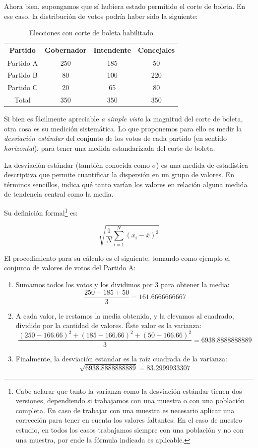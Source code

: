 \documentclass[12pt,a4paper]{article}
\begin{document}
Ahora bien, supongamos que sí hubiera estado permitido el corte de boleta. En
ese caso, la distribución de votos podría haber sido la siguiente:

\renewcommand{\arraystretch}{1.25}
\begin{table}[h!]
\centering
\begin{tabular}{c c c c} 
 Partido & Gobernador & Intendente & Concejales \\ [0.5ex] 
 \hline
Partido A & 250 & 185 & 50 \\
Partido B & 80 & 100 & 220 \\
Partido C & 20 & 65 & 80 \\
 \hline
Total & 350 & 350 & 350 \\ [1ex]
 \hline
\end{tabular}
\caption{Elecciones con corte de boleta habilitado}
\label{table:1}
\end{table}

Si bien es fácilmente apreciable \emph{a simple vista} la magnitud del corte de boleta, otra cosa es
su medición sistemática. Lo que proponemos para ello es medir la
\emph{desviación estándar} del conjunto de los votos de cada partido (en sentido
\emph{horizontal}), para tener una medida estandarizada del corte de boleta.

La desviación estándar (también conocida como \(\sigma\)) es una medida de
estadística descriptiva que permite 
cuantificar la dispersión en un grupo de valores. En términos sencillos, indica
qué tanto varían los valores en relación alguna medida de tendencia central como
la media.

Su definición formal\footnote{Cabe aclarar que tanto la varianza como la
  desviación estándar tienen dos versiones, dependiendo si trabajamos con una
  muestra o con una población completa. En caso de trabajar con una muestra es
  necesario aplicar una corrección para tener en cuenta los valores faltantes.
  En el caso de nuestro estudio, en todos los casos trabajamos siempre con una
  población y no con una muestra, por ende la fórmula indicada es aplicable.} es:

\[ \sqrt{\frac{1}{N} \sum_{i=1}^N (x_i - \overline{x})^2} \]

El procedimiento para su cálculo es el siguiente, tomando como ejemplo el
conjunto de valores de votos del Partido A:

\begin{enumerate}
  \item Sumamos todos los votos y los dividimos por 3 para obtener la media:
\[ \frac{250 + 185 + 50}{3} = 161.6666666667\]
  \item A cada valor, le restamos la media obtenida, y  la elevamos al cuadrado,
    dividido por la cantidad de valores. Éste valor es la varianza:
\[\frac{(250 - 166.66)^2 + (185 - 166.66)^2 + (50-166.66)^2}{3} = 6938.8888888889\]
  \item Finalmente, la desviación estandar es la raíz cuadrada de la varianza:
\[\sqrt{6938.8888888889} = 83.2999933307\]
\end{enumerate}
\end{document}
